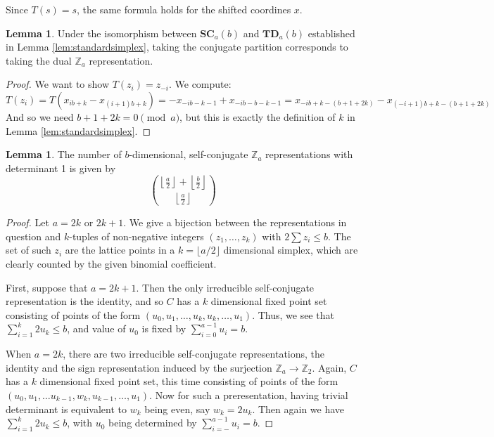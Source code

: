 \documentclass{amsart}[12pt]
\theoremstyle{definition}
\newtheorem{lemma}[dummy]{Lemma}
\newcommand{\Z}{\mathbb{Z}}
\newcommand{\SC}{\mathbf{SC}}
\newcommand{\TD}{\mathbf{TD}}
\begin{document}
Since $T(s)=s$, the same formula holds for the shifted coordines $x$. 



\begin{lemma} \label{lem:conjugatedual}
Under the isomorphism between $\SC_a(b)$ and $\TD_a(b)$ established in Lemma \ref{lem:standardsimplex}, taking the conjugate partition corresponds to taking the dual $\Z_a$ representation.
\end{lemma}

\begin{proof}
We want to show $T(z_i)=z_{-i}$.  We compute:
$$T(z_i)=T(x_{ib+k}-x_{(i+1)b+k})=-x_{-ib-k-1}+x_{-ib-b-k-1}=x_{-ib+k-(b+1+2k)}-x_{(-i+1)b+k-(b+1+2k)}$$
And so we need $b+1+2k=0\pmod a$, but this is exactly the definition of $k$ in Lemma \ref{lem:standardsimplex}.
\end{proof}



\begin{lemma} \label{lem:conjugatecount}
The number of $b$-dimensional, self-conjugate $\Z_a$ representations with determinant 1 is given by $$\binom{\left\lfloor\frac{a}{2}\right\rfloor+\left\lfloor\frac{b}{2}\right\rfloor}{\left\lfloor\frac{a}{2}\right\rfloor}$$
\end{lemma}

\begin{proof}
  Let $a=2k$ or $2k+1$.  We give a bijection between the representations in question and $k$-tuples of non-negative integers $(z_1,\dots, z_k)$ with $2\sum z_i\leq b$.  The set of such $z_i$ are the lattice points in a $k=\lfloor a/2\rfloor$ dimensional simplex, which are clearly counted by the given binomial coefficient.

First, suppose that $a=2k+1$.  Then the only irreducible self-conjugate representation is the identity, and so $C$ has a $k$ dimensional fixed point set consisting of points of the form $(u_0, u_1,\dots, u_k,u_k,\dots, u_1)$.  Thus, we see that $\sum_{i=1}^k 2u_k\leq b$, and value of $u_0$ is fixed by $\sum_{i=0}^{a-1}u_i=b$.

When $a=2k$, there are two irreducible self-conjugate representations, the identity and the sign representation induced by the surjection $\Z_a\to\Z_2$.  Again, $C$ has a $k$ dimensional fixed point set, this time consisting of points of the form $(u_0, u_1,\dots u_{k-1}, w_{k}, u_{k-1},\dots,u_1)$.  Now for such a preresentation, having trivial determinant is equivalent to $w_k$ being even, say $w_k=2u_k$.  Then again we have $\sum_{i=1}^k 2u_k\leq b$, with $u_0$ being determined by $\sum_{i=-}^{a-1}u_i=b$. 
\end{proof}
\end{document}
